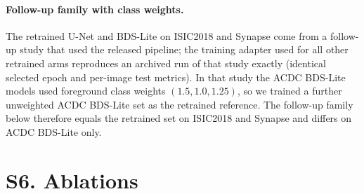 \documentclass[10pt]{article}
\begin{document}
\paragraph{Follow-up family with class weights.} The retrained U-Net and BDS-Lite on ISIC2018 and Synapse come from a follow-up study that used the released pipeline; the training adapter used for all other retrained arms reproduces an archived run of that study exactly (identical selected epoch and per-image test metrics). In that study the ACDC BDS-Lite models used foreground class weights $(1.5,1.0,1.25)$, so we trained a further unweighted ACDC BDS-Lite set as the retrained reference. The follow-up family below therefore equals the retrained set on ISIC2018 and Synapse and differs on ACDC BDS-Lite only.
\begin{table}[ht]\centering
\resizebox{\linewidth}{!}{}
\caption{Means of the follow-up family (R) and the retrained references (M).}
\end{table}
\begin{table}[ht]\centering
\resizebox{\linewidth}{!}{}
\caption{Paired BDS-Lite versus U-Net analysis in the follow-up family.}
\end{table}

\clearpage
\section*{S6. Ablations}
\begin{table}[ht]\centering
\resizebox{\linewidth}{!}{}
\caption{Three-seed means $\pm$ seed SD of all ablation arms. ACDC decoder-only values use the corrected unweighted runs (S13). The image-level contrasts below are descriptive when comparing recipes (S14).}
\end{table}
\begin{table}[ht]\centering
\resizebox{\linewidth}{!}{}
\caption{Each ablation relative to full BDS-Lite (negative: the removed component helped). $^{*}$Holm $p<0.05$ over all ablation--metric tests within dataset, with CI excluding zero.}
\end{table}
\begin{table}[ht]\centering
\resizebox{\linewidth}{!}{}
\caption{Each ablation relative to retrained U-Net; $^{*}$Holm $p<0.05$ with CI excluding zero.}
\end{table}
\end{document}
